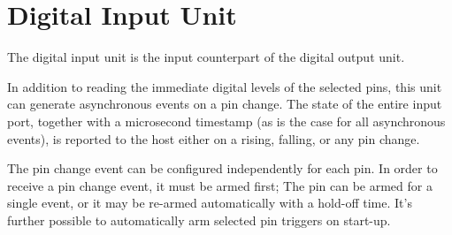 \section{Digital Input Unit}

The digital input unit is the input counterpart of the digital output unit. 

In addition to reading the immediate digital levels of the selected pins, this unit can generate asynchronous events on a pin change. The state of the entire input port, together with a microsecond timestamp (as is the case for all asynchronous events), is reported to the host either on a rising, falling, or any pin change. 

The pin change event can be configured independently for each pin. In order to receive a pin change event, it must be armed first; The pin can be armed for a single event, or it may be re-armed automatically with a hold-off time. It's further possible to automatically arm selected pin triggers on start-up.
